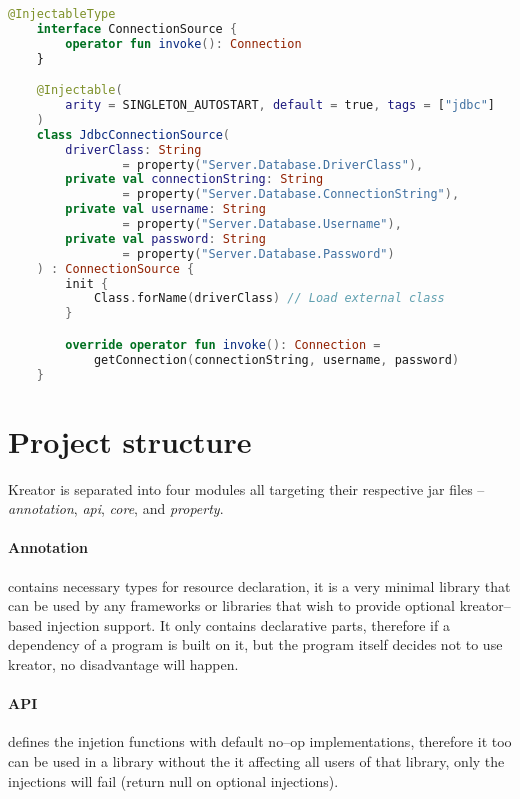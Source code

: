 		\begin{center}
			\begin{minipage}{13cm}
		\begin{lstlisting}[language=Kotlin, title={\emph{Example usage} -- \code{dbConnection.kt}}]
	@InjectableType
	interface ConnectionSource {
		operator fun invoke(): Connection
	}

	@Injectable(
		arity = SINGLETON_AUTOSTART, default = true, tags = ["jdbc"]
	)
	class JdbcConnectionSource(
		driverClass: String
				= property("Server.Database.DriverClass"),
        private val connectionString: String
        		= property("Server.Database.ConnectionString"),
        private val username: String
        		= property("Server.Database.Username"),
        private val password: String
        		= property("Server.Database.Password")
	) : ConnectionSource {
		init {
	        Class.forName(driverClass) // Load external class
	    }

	    override operator fun invoke(): Connection =
	    	getConnection(connectionString, username, password)
	}
		\end{lstlisting}
			\end{minipage}
		\end{center}
	
	\section{Project structure}
	
	Kreator is separated into four modules all targeting their respective jar files -- \emph{annotation}, \emph{api}, \emph{core}, and \emph{property}.
	
	\paragraph{Annotation} contains necessary types for resource declaration, it is a very minimal library that can be used by any frameworks or libraries that wish to provide optional kreator--based injection support. It only contains declarative parts, therefore if a dependency of a program is built on it, but the program itself decides not to use kreator, no disadvantage will happen.
	
	\paragraph{API} defines the injetion functions with default no--op implementations, therefore it too can be used in a library without the it affecting all users of that library, only the injections will fail (return null on optional injections).
	
